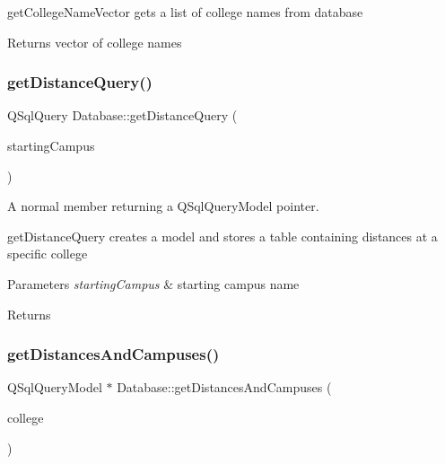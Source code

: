 get\+College\+Name\+Vector gets a list of college names from database 

\begin{DoxyReturn}{Returns}
vector of college names 
\end{DoxyReturn}
\mbox{\label{class_database_ac929cf3fc1377642328b63d0d93b47d3}} 
\subsubsection{\texorpdfstring{get\+Distance\+Query()}{getDistanceQuery()}}
{\footnotesize\ttfamily Q\+Sql\+Query Database\+::get\+Distance\+Query (\begin{DoxyParamCaption}\item[{Q\+String}]{starting\+Campus }\end{DoxyParamCaption})}



A normal member returning a Q\+Sql\+Query\+Model pointer. 

get\+Distance\+Query creates a model and stores a table containing distances at a specific college 
\begin{DoxyParams}{Parameters}
{\em starting\+Campus} & starting campus name \\
\hline
\end{DoxyParams}
\begin{DoxyReturn}{Returns}

\end{DoxyReturn}
\mbox{\label{class_database_a578021769fe26c6efe0dd0faaad4b540}} 
\subsubsection{\texorpdfstring{get\+Distances\+And\+Campuses()}{getDistancesAndCampuses()}}
{\footnotesize\ttfamily Q\+Sql\+Query\+Model $\ast$ Database\+::get\+Distances\+And\+Campuses (\begin{DoxyParamCaption}\item[{Q\+String}]{college }\end{DoxyParamCaption})}



